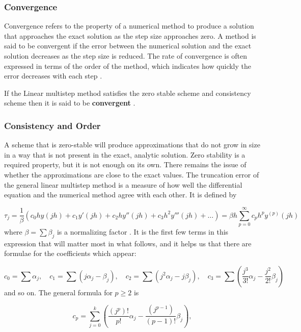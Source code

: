 \subsubsection*{Convergence} 
Convergence refers to the property of a numerical method to produce a solution that approaches the exact solution as the step size approaches zero. A method is said to be convergent if the error between the numerical solution and the exact solution decreases as the step size is reduced. The rate of convergence is often expressed in terms of the order of the method, which indicates how quickly the error decreases with each step \cite{2022JFatokunEtAl}.


If the Linear multistep method satisfies the zero stable scheme and consistency scheme then it is said to be \textbf{convergent} \cite{2022JFatokunEtAl}.

\subsubsection*{Consistency and Order}
A scheme that is zero-stable will produce approximations that do not grow in size in a way that is not present in the exact, analytic solution. Zero stability is a required property, but it is not enough on its own. There remains the issue of whether the approximations are close to the exact values. The truncation error of the general linear multistep method is a measure of how well the differential equation and the numerical method agree with each other. It is defined by


\begin{equation}
  \tau_j = \frac{1}{\beta} \left( c_0 h y(jh) + c_1 y'(jh) + c_2 h y''(jh) + c_3 h^2 y'''(jh) + \ldots \right) = \beta h \sum_{p=0}^{\infty} c_p h^p y^{(p)}(jh)
\end{equation}
where $\beta = \sum \beta_j$ is a normalizing factor \cite{2022JFatokunEtAl}.
It is the first few terms in this expression that will matter most in what follows, and it helps us that there are formulae for the coefficients which appear:


\begin{equation}
  c_0 = \sum \alpha_j, \quad c_1 = \sum (j\alpha_j - \beta_j), \quad c_2 = \sum \left( j^2 \alpha_j - j \beta_j \right), \quad c_3 = \sum \left( \frac{j^3}{3!} \alpha_j - \frac{j^2}{2!} \beta_j \right)
\end{equation}
and so on. The general formula for $p \geq 2$ is

\begin{equation}
  c_p = \sum_{j=0}^{k} \left( \frac{(j^p)!}{p!} \alpha_j - \frac{(j^{p-1})}{(p-1)!} \beta_j \right),
\end{equation}

